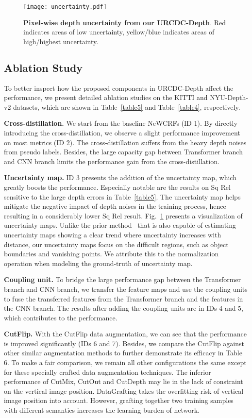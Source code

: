\documentclass[letterpaper]{article} \usepackage{aaai23}  \usepackage{times}  \usepackage{helvet}  \usepackage{courier}  \usepackage[hyphens]{url}  \usepackage{graphicx} \urlstyle{rm} \def\UrlFont{\rm}  \usepackage{natbib}  \usepackage{caption} \frenchspacing  \setlength{\pdfpagewidth}{8.5in} \setlength{\pdfpageheight}{11in} \usepackage{algorithm}
\begin{document}
\begin{figure}[!]
\centering
	\texttt{[image: uncertainty.pdf]}\caption{\textbf{Pixel-wise depth uncertainty from our URCDC-Depth}. Red indicates areas of low uncertainty, yellow/blue indicates areas of high/highest uncertainty.}
	\label{Fig7}
\end{figure}

\subsection{Ablation Study}
To better inspect how the proposed components in URCDC-Depth affect the performance, we present detailed ablation studies on the KITTI and NYU-Depth-v2 datasets, which are shown in Table~\ref{table5} and Table~\ref{table4}, respectively.

\textbf{Cross-distillation.} We start from the baseline NeWCRFs (ID 1). By directly introducing the cross-distillation, we observe a slight performance improvement on most metrics (ID 2). The cross-distillation suffers from the heavy depth noises from pseudo labels. Besides, the large capacity gap between Transformer branch and CNN branch limits the performance gain from the cross-distillation.

\textbf{Uncertainty map.} ID 3 presents the addition of the uncertainty map, which greatly boosts the performance. Especially notable are the results on Sq Rel sensitive to the large depth errors in Table~\ref{table5}. The uncertainty map helps mitigate the negative impact of depth noises in the training process, hence resulting in a considerably lower Sq Rel result. Fig.~\ref{Fig7} presents a visualization of uncertainty maps. Unlike the prior method~\cite{johnston2020self} that is also capable of estimating uncertainty maps showing a clear trend where uncertainty increases with distance, our uncertainty maps focus on the difficult regions, such as object boundaries and vanishing points. We attribute this to the normalization operation when modeling the ground-truth of uncertainty map.

\textbf{Coupling unit.} To bridge the large performance gap between the Transformer branch and CNN branch, we transfer the feature maps and use the coupling units to fuse the transferred features from the Transformer branch and the features in the CNN branch. The results after adding the coupling units are in IDs 4 and 5, which contributes to the performance.

\textbf{CutFlip.} With the CutFlip data augmentation, we can see that the performance is improved significantly (IDs 6 and 7). Besides, we compare the CutFlip against other similar augmentation methods to further demonstrate its efficacy in Table 6. To make a fair comparison, we remain all other configurations the same except for these specially crafted data augmentation techniques. The inferior performance of CutMix, CutOut and CutDepth may lie in the lack of constraint on the vertical image position. DataGrafting takes the overfitting risk of vertical image position into account. However, grafting together two training samples with different semantics increases the learning burden of network.
\end{document}
